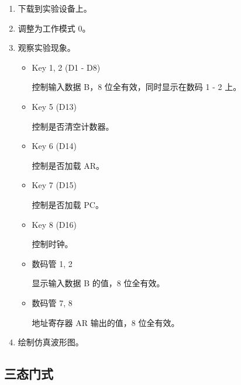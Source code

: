 \begin{enumerate}
    
    \item 下载到实验设备上。
    \item 调整为工作模式 0。
    \item 观察实验现象。
    
    \begin{itemize}
        \item Key 1, 2 (D1 - D8)
        
        控制输入数据 B，8 位全有效，同时显示在数码 1 - 2 上。
        
        \item Key 5 (D13)
        
        控制是否清空计数器。
        
        \item Key 6 (D14)
        
        控制是否加载 AR。
        
        \item Key 7 (D15)
        
        控制是否加载 PC。
        
        \item Key 8 (D16)
        
        控制时钟。
        
        \item 数码管 1, 2
        
        显示输入数据 B 的值，8 位全有效。
        
        \item 数码管 7, 8
        
        地址寄存器 AR 输出的值，8 位全有效。
        
    \end{itemize}
    \item 绘制仿真波形图。
\end{enumerate}

\subsection{三态门式}

